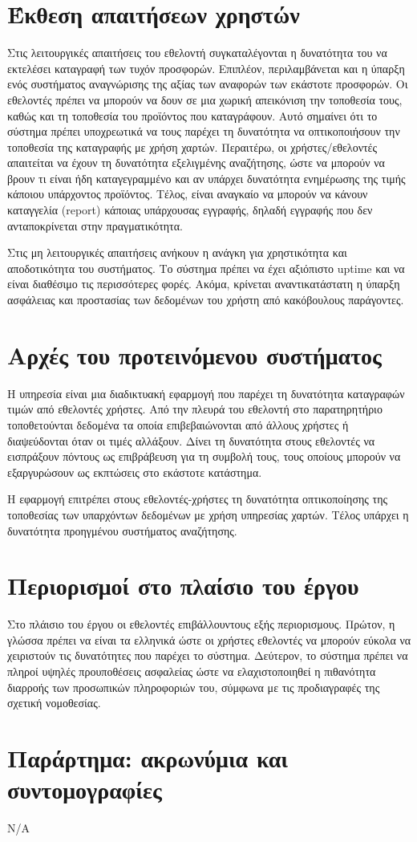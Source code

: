 \documentclass[a4paper,oneside, 12pt]{article}
\begin{document}
\section{Έκθεση απαιτήσεων χρηστών}
Στις λειτουργικές απαιτήσεις του εθελοντή συγκαταλέγονται η δυνατότητα του να εκτελέσει καταγραφή των τυχόν προσφορών. Επιπλέον, περιλαμβάνεται και η ύπαρξη ενός συστήματος αναγνώρισης της αξίας των αναφορών των εκάστοτε προσφορών. Οι εθελοντές πρέπει να μπορούν να δουν σε μια χωρική απεικόνιση την τοποθεσία τους, καθώς και τη τοποθεσία του προϊόντος που καταγράφουν. Αυτό σημαίνει ότι το σύστημα πρέπει υποχρεωτικά να τους παρέχει τη δυνατότητα να οπτικοποιήσουν την τοποθεσία της καταγραφής με χρήση χαρτών. Περαιτέρω, οι χρήστες/εθελοντές απαιτείται να έχουν τη δυνατότητα εξελιγμένης αναζήτησης, ώστε να μπορούν να βρουν τι είναι ήδη καταγεγραμμένο και αν υπάρχει δυνατότητα ενημέρωσης της τιμής κάποιου υπάρχοντος προϊόντος. Τέλος, είναι αναγκαίο να μπορούν να κάνουν καταγγελία (report) κάποιας υπάρχουσας εγγραφής, δηλαδή εγγραφής που δεν ανταποκρίνεται στην πραγματικότητα.

Στις μη λειτουργικές απαιτήσεις ανήκουν η ανάγκη για χρηστικότητα και αποδοτικότητα του συστήματος. Το σύστημα πρέπει να έχει αξιόπιστο uptime και να είναι διαθέσιμο τις περισσότερες φορές. Ακόμα, κρίνεται αναντικατάστατη η ύπαρξη ασφάλειας και προστασίας των δεδομένων του χρήστη από κακόβουλους παράγοντες.   

\section{Αρχές του προτεινόμενου συστήματος}

Η υπηρεσία είναι μια διαδικτυακή εφαρμογή που παρέχει τη δυνατότητα καταγραφών τιμών από εθελοντές χρήστες. Από την πλευρά του εθελοντή στο παρατηρητήριο  τοποθετούνται δεδομένα τα οποία επιβεβαιώνονται από άλλους χρήστες ή διαψεύδονται όταν οι τιμές αλλάξουν. Δίνει τη δυνατότητα στους εθελοντές να εισπράξουν πόντους ως επιβράβευση για τη συμβολή τους, τους οποίους μπορούν να εξαργυρώσουν ως εκπτώσεις στο εκάστοτε κατάστημα. 

Η εφαρμογή επιτρέπει στους εθελοντές-χρήστες τη δυνατότητα οπτικοποίησης της τοποθεσίας των υπαρχόντων δεδομένων με χρήση υπηρεσίας χαρτών. Τέλος υπάρχει η δυνατότητα προηγμένου συστήματος αναζήτησης.

\section{Περιορισμοί στο πλαίσιο του έργου}

Στο πλάισιο του έργου οι εθελοντές επιβάλλουντους εξής περιορισμους. Πρώτον, η γλώσσα πρέπει να είναι τα ελληνικά ώστε οι χρήστες εθελοντές να μπορούν εύκολα να χειριστούν τις δυνατότητες που παρέχει το σύστημα. Δεύτερον, το σύστημα πρέπει να πληροί υψηλές προυποθέσεις ασφαλείας ώστε να ελαχιστοποιηθεί η πιθανότητα διαρροής των προσωπικών πληροφοριών του, σύμφωνα με τις προδιαγραφές της σχετική νομοθεσίας.

\section{Παράρτημα: ακρωνύμια και συντομογραφίες}

Ν/Α
\end{document}
